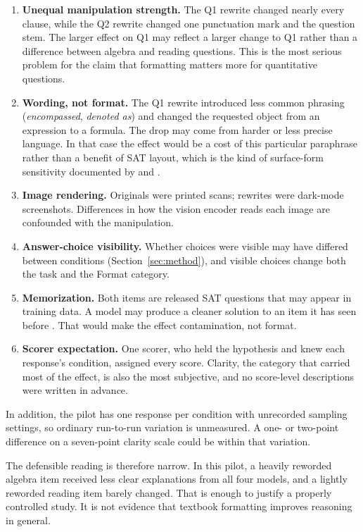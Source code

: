 \documentclass[11pt]{article}
\begin{document}
\begin{enumerate}[label=\textbf{T\arabic*.},leftmargin=2.2em]
  \item \textbf{Unequal manipulation strength.} The Q1 rewrite changed nearly every clause, while the Q2 rewrite changed one punctuation mark and the question stem. The larger effect on Q1 may reflect a larger change to Q1 rather than a difference between algebra and reading questions. This is the most serious problem for the claim that formatting matters more for quantitative questions.
  \item \textbf{Wording, not format.} The Q1 rewrite introduced less common phrasing (\emph{encompassed}, \emph{denoted as}) and changed the requested object from an expression to a formula. The drop may come from harder or less precise language. In that case the effect would be a cost of this particular paraphrase rather than a benefit of SAT layout, which is the kind of surface-form sensitivity documented by \citet{mirzadeh2024gsmsymbolic} and \citet{shi2023distracted}.
  \item \textbf{Image rendering.} Originals were printed scans; rewrites were dark-mode screenshots. Differences in how the vision encoder reads each image are confounded with the manipulation.
  \item \textbf{Answer-choice visibility.} Whether choices were visible may have differed between conditions (Section~\ref{sec:method}), and visible choices change both the task and the Format category.
  \item \textbf{Memorization.} Both items are released SAT questions that may appear in training data. A model may produce a cleaner solution to an item it has seen before \citep{golchin2024timetravel,zhang2024gsm1k}. That would make the effect contamination, not format.
  \item \textbf{Scorer expectation.} One scorer, who held the hypothesis and knew each response's condition, assigned every score. Clarity, the category that carried most of the effect, is also the most subjective, and no score-level descriptions were written in advance.
\end{enumerate}

In addition, the pilot has one response per condition with unrecorded sampling settings, so ordinary run-to-run variation is unmeasured. A one- or two-point difference on a seven-point clarity scale could be within that variation.

The defensible reading is therefore narrow. In this pilot, a heavily reworded algebra item received less clear explanations from all four models, and a lightly reworded reading item barely changed. That is enough to justify a properly controlled study. It is not evidence that textbook formatting improves reasoning in general.
\end{document}
